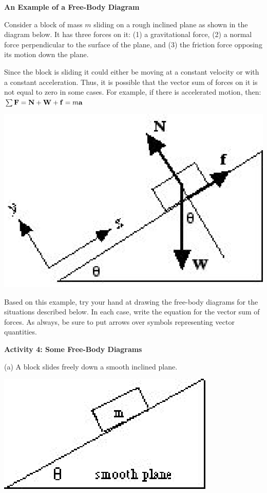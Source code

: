 \textbf{An Example of a Free-Body Diagram} 

Consider a block of mass $m$ sliding on a rough inclined plane as shown in the
diagram below. It has three forces on it: (1) a gravitational force, (2) a normal
force perpendicular to the surface of the plane, and (3) the friction force
opposing its motion down the plane.

Since the block is sliding it could either be moving at a constant velocity
or with a constant acceleration. Thus, it is possible that the vector sum of
forces on it is not equal to zero in some cases. For example, if there is accelerated
motion, then: \( \sum {\bf F} = {\bf N} + {\bf W} + {\bf f}
= m{\bf a}\)

\vspace{0.3cm}
{\par\centering \includegraphics{friction_fig2.eps} \par}
\vspace{0.3cm}

Based on this example, try your hand at drawing the free-body diagrams for the
situations described below. In each case, write the equation for the vector
sum of forces. As always, be sure to put arrows over symbols representing vector
quantities.

\textbf{Activity 4: Some Free-Body Diagrams} 

(a) A block slides freely down a smooth inclined plane.

\vspace{0.3cm}
{\par\centering \includegraphics{friction_fig3.eps} \par}
\vspace{0.3cm}

